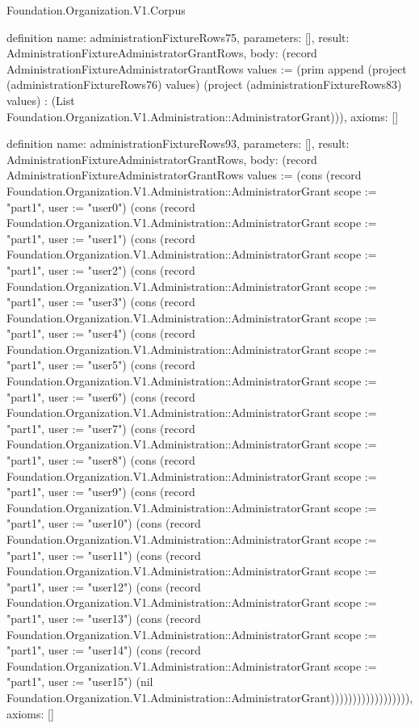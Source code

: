 \begin{lexlean}{Foundation.Organization.V1.Corpus}
\begin{semanticmodule}
definition{
  name: administrationFixtureRows75,
  parameters: [],
  result: AdministrationFixtureAdministratorGrantRows,
  body: (record AdministrationFixtureAdministratorGrantRows {values := (prim append (project (administrationFixtureRows76) values) (project (administrationFixtureRows83) values) : (List Foundation.Organization.V1.Administration::AdministratorGrant))}),
  axioms: []
}

definition{
  name: administrationFixtureRows93,
  parameters: [],
  result: AdministrationFixtureAdministratorGrantRows,
  body: (record AdministrationFixtureAdministratorGrantRows {values := (cons (record Foundation.Organization.V1.Administration::AdministratorGrant {scope := "part1", user := "user0"}) (cons (record Foundation.Organization.V1.Administration::AdministratorGrant {scope := "part1", user := "user1"}) (cons (record Foundation.Organization.V1.Administration::AdministratorGrant {scope := "part1", user := "user2"}) (cons (record Foundation.Organization.V1.Administration::AdministratorGrant {scope := "part1", user := "user3"}) (cons (record Foundation.Organization.V1.Administration::AdministratorGrant {scope := "part1", user := "user4"}) (cons (record Foundation.Organization.V1.Administration::AdministratorGrant {scope := "part1", user := "user5"}) (cons (record Foundation.Organization.V1.Administration::AdministratorGrant {scope := "part1", user := "user6"}) (cons (record Foundation.Organization.V1.Administration::AdministratorGrant {scope := "part1", user := "user7"}) (cons (record Foundation.Organization.V1.Administration::AdministratorGrant {scope := "part1", user := "user8"}) (cons (record Foundation.Organization.V1.Administration::AdministratorGrant {scope := "part1", user := "user9"}) (cons (record Foundation.Organization.V1.Administration::AdministratorGrant {scope := "part1", user := "user10"}) (cons (record Foundation.Organization.V1.Administration::AdministratorGrant {scope := "part1", user := "user11"}) (cons (record Foundation.Organization.V1.Administration::AdministratorGrant {scope := "part1", user := "user12"}) (cons (record Foundation.Organization.V1.Administration::AdministratorGrant {scope := "part1", user := "user13"}) (cons (record Foundation.Organization.V1.Administration::AdministratorGrant {scope := "part1", user := "user14"}) (cons (record Foundation.Organization.V1.Administration::AdministratorGrant {scope := "part1", user := "user15"}) (nil Foundation.Organization.V1.Administration::AdministratorGrant)))))))))))))))))}),
  axioms: []
}


\end{semanticmodule}
\end{lexlean}
